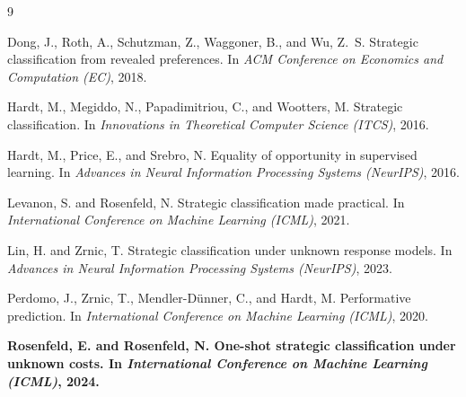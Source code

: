 \documentclass[10pt, letterpaper]{article}
\begin{document}
\begin{thebibliography}{9}

Dong, J., Roth, A., Schutzman, Z., Waggoner, B., and Wu, Z.~S.
\newblock Strategic classification from revealed preferences.
\newblock In \emph{ACM Conference on Economics and Computation (EC)}, 2018.

Hardt, M., Megiddo, N., Papadimitriou, C., and Wootters, M.
\newblock Strategic classification.
\newblock In \emph{Innovations in Theoretical Computer Science (ITCS)}, 2016{}.

Hardt, M., Price, E., and Srebro, N.
\newblock Equality of opportunity in supervised learning.
\newblock In \emph{Advances in Neural Information Processing Systems (NeurIPS)}, 2016{}.

Levanon, S. and Rosenfeld, N.
\newblock Strategic classification made practical.
\newblock In \emph{International Conference on Machine Learning (ICML)}, 2021.

Lin, H. and Zrnic, T.
\newblock Strategic classification under unknown response models.
\newblock In \emph{Advances in Neural Information Processing Systems (NeurIPS)}, 2023.

Perdomo, J., Zrnic, T., Mendler-D{\"u}nner, C., and Hardt, M.
\newblock Performative prediction.
\newblock In \emph{International Conference on Machine Learning (ICML)}, 2020.

\textbf{Rosenfeld, E. and Rosenfeld, N.
\newblock One-shot strategic classification under unknown costs.
\newblock In \emph{International Conference on Machine Learning (ICML)}, 2024.}

\end{thebibliography}
\end{document}
